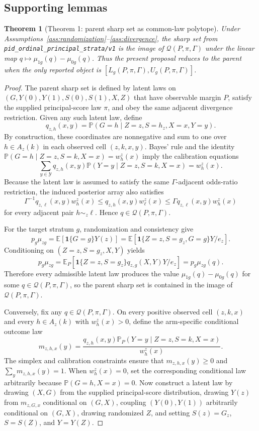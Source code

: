 \documentclass[11pt]{article}
\newcommand{\E}{\mathbb{E}}
\renewcommand{\Pr}{\mathbb{P}}
\newcommand{\one}{\mathbf{1}}
\theoremstyle{definition}
\theoremstyle{plain}
\newtheorem{theorem}{Theorem}
\theoremstyle{remark}
\begin{document}
\subsection*{Supporting lemmas}
\begin{theorem}[Theorem 1: parent sharp set as common-law polytope]\label{thm:parent-reduction}
Under Assumptions~\ref{ass:randomization}--\ref{ass:divergence}, the sharp set from \texttt{pid\_ordinal\_principal\_strata/v1} is the image of \(\mathcal Q(P,\pi,\Gamma)\) under the linear map \(q\mapsto\mu_{1g}(q)-\mu_{0g}(q)\).  Thus the present proposal reduces to the parent when the only reported object is \([L_g(P,\pi,\Gamma),U_g(P,\pi,\Gamma)]\).
\end{theorem}
\begin{proof}
The parent sharp set is defined by latent laws on \((G,Y(0),Y(1),S(0),S(1),X,Z)\) that have observable margin \(P\), satisfy the supplied principal-score law \(\pi\), and obey the same adjacent divergence restriction.  Given any such latent law, define
\[
  q_{z,h}(x,y)=\Pr(G=h\mid Z=z,S=h_z,X=x,Y=y).
\]
By construction, these coordinates are nonnegative and sum to one over \(h\in A_z(k)\) in each observed cell \((z,k,x,y)\).  Bayes' rule and the identity \(\Pr(G=h\mid Z=z,S=k,X=x)=w_h^z(x)\) imply the calibration equations
\[
  \sum_{y\in\mathcal Y} q_{z,h}(x,y)\Pr(Y=y\mid Z=z,S=k,X=x)=w_h^z(x).
\]
Because the latent law is assumed to satisfy the same \(\Gamma\)-adjacent odds-ratio restriction, the induced posterior array also satisfies
\[
  \Gamma^{-1}q_{z,\ell}(x,y)w_h^z(x)
  \le q_{z,h}(x,y)w_\ell^z(x)
  \le \Gamma q_{z,\ell}(x,y)w_h^z(x)
\]
for every adjacent pair \(h\sim_z \ell\).  Hence \(q\in\mathcal Q(P,\pi,\Gamma)\).

For the target stratum \(g\), randomization and consistency give
\[
  p_g\mu_{zg}=\E[\one\{G=g\}Y(z)] = \E[\one\{Z=z,S=g_z,G=g\}Y/e_z].
\]
Conditioning on \((Z=z,S=g_z,X,Y)\) yields
\[
  p_g\mu_{zg}=\E_P[\one\{Z=z,S=g_z\}q_{z,g}(X,Y)Y/e_z]=p_g\mu_{zg}(q).
\]
Therefore every admissible latent law produces the value \(\mu_{1g}(q)-\mu_{0g}(q)\) for some \(q\in\mathcal Q(P,\pi,\Gamma)\), so the parent sharp set is contained in the image of \(\mathcal Q(P,\pi,\Gamma)\).

Conversely, fix any \(q\in\mathcal Q(P,\pi,\Gamma)\).  On every positive observed cell \((z,k,x)\) and every \(h\in A_z(k)\) with \(w_h^z(x)>0\), define the arm-specific conditional outcome law
\[
  m_{z,h,x}(y)=\frac{q_{z,h}(x,y)\Pr_P(Y=y\mid Z=z,S=k,X=x)}{w_h^z(x)}.
\]
The simplex and calibration constraints ensure that \(m_{z,h,x}(y)\ge 0\) and \(\sum_y m_{z,h,x}(y)=1\).  When \(w_h^z(x)=0\), set the corresponding conditional law arbitrarily because \(\Pr(G=h,X=x)=0\).  Now construct a latent law by drawing \((X,G)\) from the supplied principal-score distribution, drawing \(Y(z)\) from \(m_{z,G,x}\) conditional on \((G,X)\), coupling \((Y(0),Y(1))\) arbitrarily conditional on \((G,X)\), drawing randomized \(Z\), and setting \(S(z)=G_z\), \(S=S(Z)\), and \(Y=Y(Z)\).


\end{proof}
\end{document}
